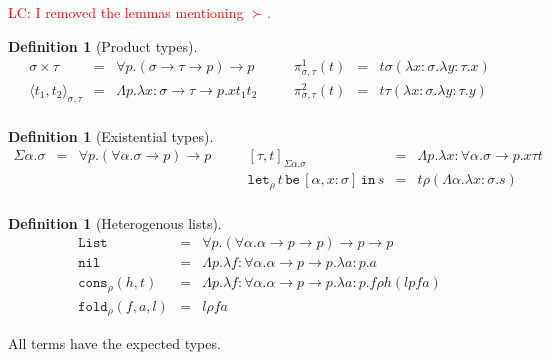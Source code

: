\documentclass[a4paper,UKenglish,cleveref,autoref,numberwithinsect]{lipics-v2019}
\theoremstyle{definition}
\newtheorem{defn}[theorem]{Definition}
\newcommand{\arrtype}{\rightarrow}
\newcommand{\abs}[2]{\lambda #1.#2}
\newcommand{\tabs}[2]{\Lambda #1.#2}
\newcommand{\pair}[2]{\langle #1,#2 \rangle}
\newcommand{\expair}[2]{[#1,#2]}
\newcommand{\List}{\mathtt{List}}
\newcommand{\nil}{\mathtt{nil}}
\newcommand{\cons}{\mathtt{cons}}
\newcommand{\fold}{\mathtt{fold}}
\newcommand{\xlet}[4]{\mathtt{let}_{#1}\,#2\,\mathtt{be}\,[#3]\,\mathtt{in}\,#4}
\newcommand{\LC}[1]{\textcolor{red}{LC: #1}}
\begin{document}
\LC{I removed the lemmas mentioning $\succ$.}

\begin{defn}[Product types]
  \[
  \begin{array}{rclcrcl}
    \sigma \times \tau &=& \forall p . (\sigma \arrtype \tau \arrtype p) \arrtype p & \quad &
    \pi^1_{\sigma,\tau}(t) &=& t \sigma (\abs{x:\sigma}{\abs{y:\tau}{x}}) \\
    \pair{t_1}{t_2}_{\sigma,\tau} &=& \tabs{p}{\abs{x:\sigma\arrtype\tau\arrtype p}{x t_1 t_2}} & &
    \pi^2_{\sigma,\tau}(t) &=& t \tau (\abs{x:\sigma}{\abs{y:\tau}{y}}) \\
  \end{array}
  \]
\end{defn}

\begin{defn}[Existential types]
  \[
  \begin{array}{rclcrcl}
    \Sigma \alpha . \sigma &=& \forall p . (\forall \alpha . \sigma \arrtype p) \arrtype p & \quad &
    \expair{\tau}{t}_{\Sigma\alpha.\sigma} &=& \tabs{p}{\abs{x:\forall\alpha.\sigma\arrtype p}{x \tau t}} \\
    & & & &
    \xlet{\rho}{t}{\alpha,x:\sigma}{s} &=& t \rho (\tabs{\alpha}{\abs{x:\sigma}{s}}) \\
  \end{array}
  \]
\end{defn}

\begin{defn}[Heterogenous lists]
  \[
  \begin{array}{rcl}
    \List &=& \forall p . (\forall \alpha . \alpha \arrtype p \arrtype p) \arrtype p \arrtype p \\
    \nil &=& \tabs{p}{\abs{f:\forall \alpha . \alpha \arrtype p \arrtype p}{\abs{a : p}{a}}} \\
    \cons_\rho(h,t) &=& \tabs{p}{\abs{f:\forall\alpha . \alpha \arrtype p \arrtype p}{\abs{a : p}{f \rho h (l p f a)}}} \\
    \fold_\rho(f,a,l) &=& l \rho f a
  \end{array}
  \]
\end{defn}

All terms have the expected types.
\end{document}
